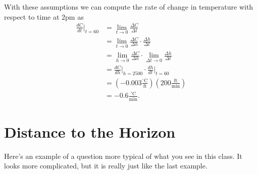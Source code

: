 \documentclass{ximera}
\begin{document}

With these assumptions we can compute the rate of change in temperature with respect to time at 2pm as
\begin{align*}
         \frac{dC}{dt}\Big|_{t=60} &= \lim_{t\to 0} \frac{\Delta C}{\Delta t} \\
                                                &= \lim_{t\to 0} \frac{\Delta C}{\Delta h} \cdot \frac{\Delta h}{\Delta t} \\
                                               &= \lim_{h\to 0} \frac{\Delta C}{\Delta h} \cdot \lim_{\Delta t \to 0} \frac{\Delta h}{\Delta t} \\
                                               &=  \frac{dC}{dh}\Big|_{h=2500} \cdot  \frac{dh}{dt}\Big|_{t=60} \\
                                             &=  \left( -0.003 \frac{^\circ\text{C}}{\text{ft}}\right) \left(200  \frac{\text{ft}}{\text{min}} \right) \\
                                            & = -0.6\frac{^\circ\text{C}}{\text{min}} .
\end{align*}


\section{Distance to the Horizon}
Here's an example of a question more typical of what you see in this class. It looks more complicated, but it is really just like the last example.
\end{document}
